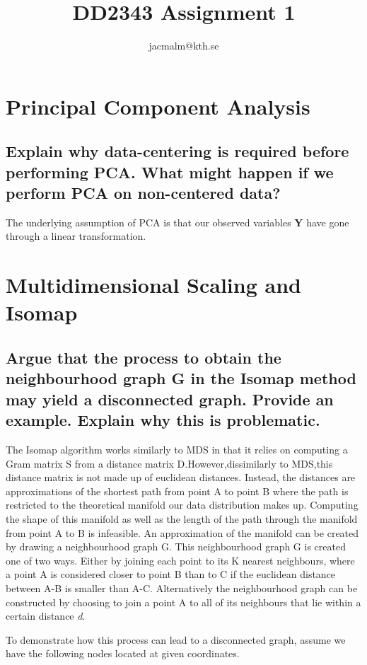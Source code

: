 \documentclass[11pt,a4paper,landscape]{article}
\author{jacmalm@kth.se}
\title{DD2343 Assignment 1}
\begin{document}
\maketitle
\newpage
\section{Principal Component Analysis}

\subsection{Explain why data-centering is required before performing PCA.  What might happen if we perform PCA on non-centered data?}

The underlying assumption of PCA is that our observed variables \textbf{Y} have gone through a linear transformation.


\section{Multidimensional Scaling and Isomap}

\subsection{Argue that the process to obtain the neighbourhood graph G in the Isomap method may yield a disconnected graph.  Provide an example.  Explain why this is problematic.}

The Isomap algorithm works similarly to MDS in that it relies on computing a Gram matrix S from a distance matrix D.However,dissimilarly to MDS,this distance matrix is not made up of euclidean distances. Instead, the distances are approximations of the shortest path from point A to point B where the path is restricted to the theoretical manifold our data distribution makes up. Computing the shape of this manifold as well as the length of the path through the manifold from point A to B is infeasible. An approximation of the manifold can be created by drawing a neighbourhood graph G. This neighbourhood graph G is created one of two ways. Either by joining each point to its K nearest neighbours, where a point A is considered closer to point B than to C if the euclidean distance between A-B is smaller than A-C.  Alternatively the neighbourhood graph can be constructed by choosing to join a point A to all of its neighbours that lie within a certain distance \textit{d}.

To demonstrate how this process can lead to a disconnected graph,  assume we have the following nodes located at given coordinates.
\end{document}

